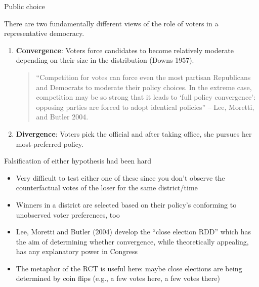\documentclass{beamer}
\begin{document}
\begin{frame}{Public choice}

There are two fundamentally different views of the role of voters in a representative democracy.
		\begin{enumerate}
		\item \textbf{Convergence}: Voters force candidates to become relatively moderate depending on their size in the distribution (Downs 1957).  \begin{quote}``Competition for votes can force even the most partisan Republicans and Democrats to moderate their policy choices. In the extreme case, competition may be so strong that it leads to `full policy convergence': opposing parties are forced to adopt identical policies'' -- Lee, Moretti, and Butler 2004.\end{quote}
		\item \textbf{Divergence}: Voters pick the official and after taking office, she pursues her most-preferred policy.  
		\end{enumerate}

\end{frame}


\begin{frame}{Falsification of either hypothesis had been hard}

\begin{itemize}
\item Very difficult to test either one of these since you don't observe the counterfactual votes of the loser for the same district/time
\item Winners in a district are selected based on their policy's conforming to unobserved voter preferences, too
\item Lee, Moretti and Butler (2004) develop the ``close election RDD'' which has the aim of determining whether convergence, while theoretically appealing, has any explanatory power in Congress
\item The metaphor of the RCT is useful here: maybe close elections are being determined by coin flips (e.g., a few votes here, a few votes there)
\end{itemize}

\end{frame}
\end{document}
